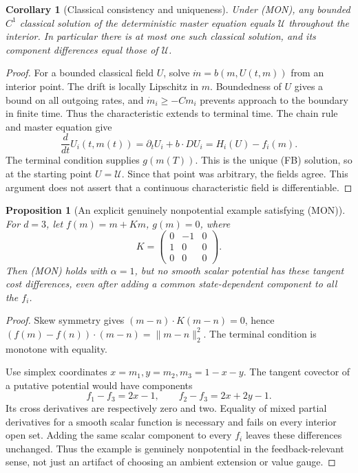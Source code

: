 \documentclass[11pt,a4paper]{article}
\newtheorem{proposition}[theorem]{Proposition}
\newtheorem{corollary}[theorem]{Corollary}
\theoremstyle{definition}
\theoremstyle{remark}
\begin{document}
\begin{corollary}[Classical consistency and uniqueness]
Under (MON), any bounded $C^1$ classical solution of the deterministic master equation equals $\mathcal U$ throughout the interior. In particular there is at most one such classical solution, and its component differences equal those of $\mathcal U$.
\end{corollary}
\begin{proof}
For a bounded classical field $U$, solve $\dot m=b(m,U(t,m))$ from an interior point. The drift is locally Lipschitz in $m$. Boundedness of $U$ gives a bound on all outgoing rates, and $\dot m_i\geq-Cm_i$ prevents approach to the boundary in finite time. Thus the characteristic extends to terminal time. The chain rule and master equation give
\[
 \frac d{dt}U_i(t,m(t))=\partial_tU_i+b\cdot DU_i=H_i(U)-f_i(m).
\]
The terminal condition supplies $g(m(T))$. This is the unique (FB) solution, so at the starting point $U=\mathcal U$. Since that point was arbitrary, the fields agree. This argument does not assert that a continuous characteristic field is differentiable.
\end{proof}

\begin{proposition}[An explicit genuinely nonpotential example satisfying (MON)]
For $d=3$, let $f(m)=m+Km$, $g(m)=0$, where
\[
 K=\begin{pmatrix}0&-1&0\\1&0&0\\0&0&0\end{pmatrix}.
\]
Then (MON) holds with $\alpha=1$, but no smooth scalar potential has these tangent cost differences, even after adding a common state-dependent component to all the $f_i$.
\end{proposition}
\begin{proof}
Skew symmetry gives $(m-n)\cdot K(m-n)=0$, hence
$(f(m)-f(n))\cdot(m-n)=\|m-n\|_2^2$. The terminal condition is monotone with equality.

Use simplex coordinates $x=m_1,y=m_2,m_3=1-x-y$. The tangent covector of a putative potential would have components
\[
 f_1-f_3=2x-1,\qquad f_2-f_3=2x+2y-1.
\]
Its cross derivatives are respectively zero and two. Equality of mixed partial derivatives for a smooth scalar function is necessary and fails on every interior open set. Adding the same scalar component to every $f_i$ leaves these differences unchanged. Thus the example is genuinely nonpotential in the feedback-relevant sense, not just an artifact of choosing an ambient extension or value gauge.
\end{proof}
\end{document}
